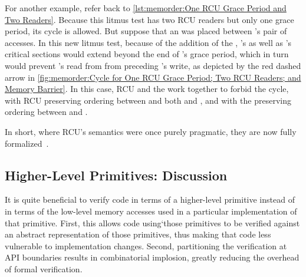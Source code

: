 For another example, refer back to
\cref{lst:memorder:One RCU Grace Period and Two Readers}.
Because this litmus test has two RCU readers but only one grace period,
its cycle is allowed.
But suppose that an  was placed between 's
pair of accesses.
In this new litmus test, because of the addition of the ,
's as well as 's critical sections would extend beyond the
end of 's grace period, which in turn would prevent 's
read from  from preceding 's write, as depicted by the
red dashed arrow in
\cref{fig:memorder:Cycle for One RCU Grace Period; Two RCU Readers; and Memory Barrier}.
In this case, RCU and the  work together to forbid
the cycle, with RCU preserving ordering between  and both
 and , and with the  preserving
ordering between  and .

\QuickQuizEnd

In short, where RCU's semantics were once purely pragmatic, they are
now fully
formalized~\cite{PaulMcKenney2005RCUSemantics,MathieuDesnoyers2012URCU,AlexeyGotsman2013ESOPRCU,Alglave:2018:FSC:3173162.3177156}.




\subsection{Higher-Level Primitives:
	    Discussion}
\label{sec:memorder:Higher-Level Primitives: Discussion}

It is quite beneficial to verify code in terms of a higher-level primitive
instead of in terms of the low-level memory accesses used in a particular
implementation of that primitive.
First, this allows code using`those primitives to be
verified against an abstract representation of those primitives,
thus making that code less vulnerable to implementation changes.
Second, partitioning the verification at API boundaries results in
combinatorial implosion, greatly reducing the overhead of formal
verification.

